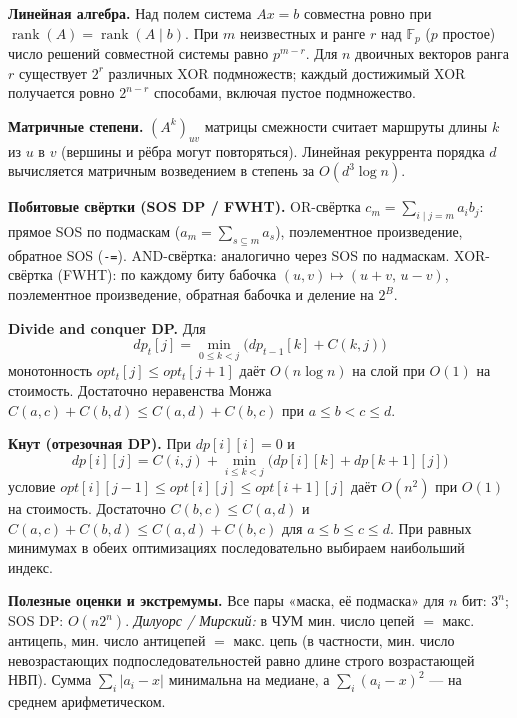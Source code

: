 \textbf{Линейная алгебра.} Над полем система $Ax=b$ совместна ровно при $\operatorname{rank}(A)=\operatorname{rank}(A\mid b)$. При $m$ неизвестных и ранге $r$ над $\mathbb F_p$ ($p$ простое) число решений совместной системы равно $p^{m-r}$.
Для $n$ двоичных векторов ранга $r$ существует $2^r$ различных XOR подмножеств; каждый достижимый XOR получается ровно $2^{n-r}$ способами, включая пустое подмножество.

\textbf{Матричные степени.} $(A^k)_{uv}$ матрицы смежности считает маршруты длины $k$ из $u$ в $v$ (вершины и рёбра могут повторяться). Линейная рекуррента порядка $d$ вычисляется матричным возведением в степень за $O(d^3\log n)$.

\textbf{Побитовые свёртки (SOS DP / FWHT).}
OR-свёртка $c_m=\sum_{i\mid j=m}a_ib_j$: прямое SOS по подмаскам ($\hat a_m=\sum_{s\subseteq m}a_s$), поэлементное произведение, обратное SOS (\texttt{-=}).
AND-свёртка: аналогично через SOS по надмаскам.
XOR-свёртка (FWHT): по каждому биту бабочка $(u,v)\mapsto(u+v,\,u-v)$, поэлементное произведение, обратная бабочка и деление на $2^B$.

\textbf{Divide and conquer DP.} Для
\[
  dp_t[j]=\min_{0\le k<j}\bigl(dp_{t-1}[k]+C(k,j)\bigr)
\]
монотонность $opt_t[j]\le opt_t[j+1]$ даёт $O(n\log n)$ на слой при $O(1)$ на стоимость. Достаточно неравенства Монжа
$C(a,c)+C(b,d)\le C(a,d)+C(b,c)$ при $a\le b<c\le d$.

\textbf{Кнут (отрезочная DP).} При $dp[i][i]=0$ и
\[
  dp[i][j]=C(i,j)+\min_{i\le k<j}
    \bigl(dp[i][k]+dp[k+1][j]\bigr)
\]
условие $opt[i][j-1]\le opt[i][j]\le opt[i+1][j]$ даёт $O(n^2)$ при $O(1)$ на стоимость.
Достаточно $C(b,c)\le C(a,d)$ и
$C(a,c)+C(b,d)\le C(a,d)+C(b,c)$ для $a\le b\le c\le d$.
При равных минимумах в обеих оптимизациях последовательно выбираем наибольший индекс.

\textbf{Полезные оценки и экстремумы.}
Все пары «маска, её подмаска» для $n$ бит: $3^n$; SOS DP: $O(n2^n)$.
\emph{Дилуорс / Мирский:} в ЧУМ мин. число цепей $=$ макс. антицепь, мин. число антицепей $=$ макс. цепь (в частности, мин. число невозрастающих подпоследовательностей равно длине строго возрастающей НВП).
Сумма $\sum_i|a_i-x|$ минимальна на медиане, а $\sum_i(a_i-x)^2$ --- на среднем арифметическом.


